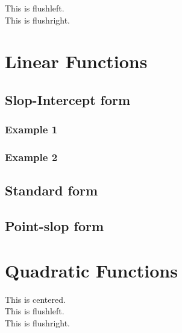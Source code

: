 \documentclass[12pt]{article}
\begin{document}
This is flushleft.\\

This is flushright.



\section{Linear Functions}
	\subsection{Slop-Intercept form}
		\subsubsection{Example 1}
		\subsubsection{Example 2}
	\subsection{Standard form}
	\subsection{Point-slop form}
\section{Quadratic Functions}




\centering
This is centered.\\
This is flushleft.\\
This is flushright.
\end{document}
